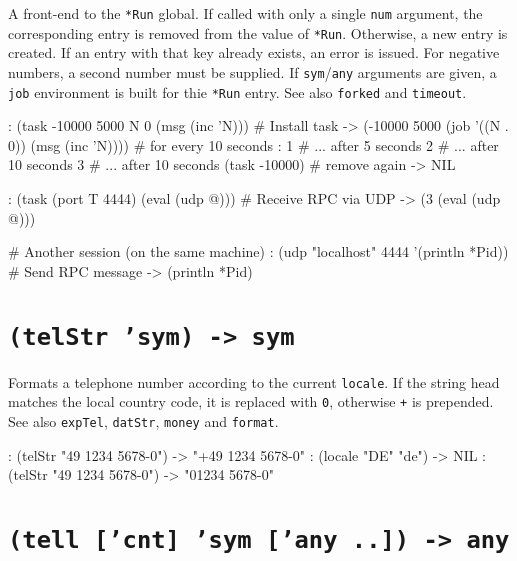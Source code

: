 A front-end to the \texttt{*Run} global. If called with only a single
\texttt{num} argument, the corresponding entry is removed from the
value of \texttt{*Run}. Otherwise, a new entry is created. If an entry
with that key already exists, an error is issued. For negative
numbers, a second number must be supplied. If
\texttt{sym}/\texttt{any} arguments are given, a \texttt{job}
environment is built for thie \texttt{*Run} entry. See also
\texttt{forked} and \texttt{timeout}.


\begin{wideverbatim}
: (task -10000 5000 N 0 (msg (inc 'N)))            # Install task
-> (-10000 5000 (job '((N . 0)) (msg (inc 'N))))   # for every 10 seconds
: 1                                                # ... after 5 seconds
2                                                  # ... after 10 seconds
3                                                  # ... after 10 seconds
(task -10000)                                      # remove again
-> NIL

: (task (port T 4444) (eval (udp @)))              # Receive RPC via UDP
-> (3 (eval (udp @)))

# Another session (on the same machine)
: (udp "localhost" 4444 '(println *Pid))  # Send RPC message
-> (println *Pid)
\end{wideverbatim}

 
\section*{\texttt{(telStr 'sym) -> sym}}
\label{sec:func-ref-T-(telStr 'sym) -> sym}


Formats a telephone number according to the current \texttt{locale}. If the
string head matches the local country code, it is replaced with \texttt{0},
otherwise \texttt{+} is prepended. See also \texttt{expTel}, \texttt{datStr}, \texttt{money} and
\texttt{format}.


\begin{wideverbatim}
: (telStr "49 1234 5678-0")
-> "+49 1234 5678-0"
: (locale "DE" "de")
-> NIL
: (telStr "49 1234 5678-0")
-> "01234 5678-0"
\end{wideverbatim}

 
\section*{\texttt{(tell ['cnt] 'sym ['any ..]) -> any}}
\label{sec:func-ref-T-(tell ['cnt] 'sym ['any ..]) -> any}


